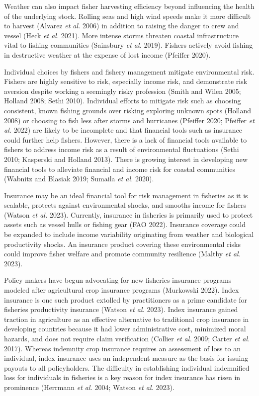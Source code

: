 \documentclass[
  letterpaper,
  DIV=11,
  numbers=noendperiod]{scrartcl}
\theoremstyle{plain}
\theoremstyle{plain}
\theoremstyle{remark}
\begin{document}
Weather can also impact fisher harvesting efficiency beyond influencing
the health of the underlying stock. Rolling seas and high wind speeds
make it more difficult to harvest (Alvarez \emph{et al.} 2006) in
addition to raising the danger to crew and vessel (Heck \emph{et al.}
2021). More intense storms threaten coastal infrastructure vital to
fishing communities (Sainsbury \emph{et al.} 2019). Fishers actively
avoid fishing in destructive weather at the expense of lost income
(Pfeiffer 2020).

Individual choices by fishers and fishery management mitigate
environmental risk. Fishers are highly sensitive to risk, especially
income risk, and demonstrate risk aversion despite working a seemingly
risky profession (Smith and Wilen 2005; Holland 2008; Sethi 2010).
Individual efforts to mitigate risk such as choosing consistent, known
fishing grounds over risking exploring unknown spots (Holland 2008) or
choosing to fish less after storms and hurricanes (Pfeiffer 2020;
Pfeiffer \emph{et al.} 2022) are likely to be incomplete and that
financial tools such as insurance could further help fishers. However,
there is a lack of financial tools available to fishers to address
income risk as a result of environmental fluctuations (Sethi 2010;
Kasperski and Holland 2013). There is growing interest in developing new
financial tools to alleviate financial and income risk for coastal
communities (Wabnitz and Blasiak 2019; Sumaila \emph{et al.} 2020).

Insurance may be an ideal financial tool for risk management in
fisheries as it is scalable, protects against environmental shocks, and
smooths income for fishers (Watson \emph{et al.} 2023). Currently,
insurance in fisheries is primarily used to protect assets such as
vessel hulls or fishing gear (FAO 2022). Insurance coverage could be
expanded to include income variability originating from weather and
biological productivity shocks. An insurance product covering these
environmental risks could improve fisher welfare and promote community
resilience (Maltby \emph{et al.} 2023).

Policy makers have begun advocating for new fisheries insurance programs
modeled after agricultural crop insurance programs (Murkowski 2022).
Index insurance is one such product extolled by practitioners as a prime
candidate for fisheries productivity insurance (Watson \emph{et al.}
2023). Index insurance gained traction in agriculture as an effective
alternative to traditional crop insurance in developing countries
because it had lower administrative cost, minimized moral hazards, and
does not require claim verification (Collier \emph{et al.} 2009; Carter
\emph{et al.} 2017). Whereas indemnity crop insurance requires an
assessment of loss to an individual, index insurance uses an independent
measure as the basis for issuing payouts to all policyholders. The
difficulty in establishing individual indemnified loss for individuals
in fisheries is a key reason for index insurance has risen in prominence
(Herrmann \emph{et al.} 2004; Watson \emph{et al.} 2023).
\end{document}
